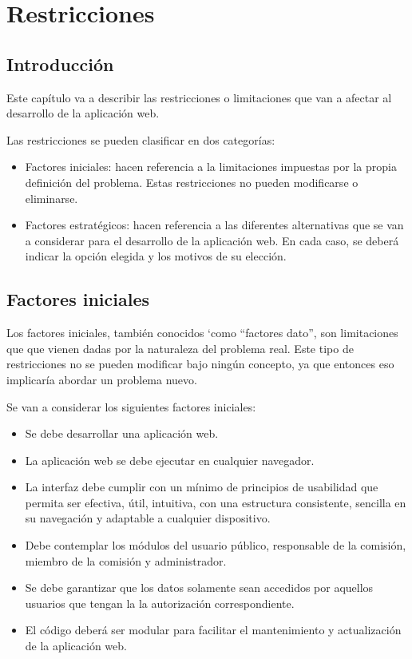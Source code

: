 \chapter{Restricciones} \label{cap:restricciones}

\section{Introducción}

Este capítulo va a describir las restricciones o limitaciones que van a afectar al desarrollo de la aplicación web. 

Las restricciones se pueden clasificar en dos categorías:
\begin{itemize}
    \item Factores iniciales: hacen referencia a la limitaciones impuestas por la propia definición del problema. Estas restricciones no pueden modificarse o eliminarse.
    \item Factores estratégicos: hacen referencia a las diferentes alternativas que se van a considerar para el desarrollo de la aplicación web. En cada caso, se deberá indicar la opción elegida y los motivos de su elección.
\end{itemize}


\section{Factores iniciales} \label{sec:iniciales}

Los factores iniciales,  también conocidos `como ``factores dato'', son limitaciones que que vienen dadas por la naturaleza del problema real. Este tipo de restricciones no se pueden  modificar bajo ningún concepto, ya que entonces eso implicaría abordar un problema nuevo.

Se van a considerar los siguientes factores iniciales:
\begin{itemize}
    \item Se debe desarrollar una aplicación web.
    \item La aplicación web se debe ejecutar en cualquier navegador.
    \item La interfaz debe cumplir con un mínimo de principios de usabilidad que permita ser efectiva, útil, intuitiva, con una estructura consistente, sencilla en su navegación y adaptable a cualquier dispositivo.
    \item Debe contemplar los módulos del usuario público, responsable de la comisión, miembro de la comisión y administrador. 
    \item Se debe garantizar que los datos solamente sean accedidos por aquellos usuarios que tengan la la autorización correspondiente.
    \item El código deberá ser modular para facilitar el mantenimiento y actualización de la aplicación web.
\end{itemize}

